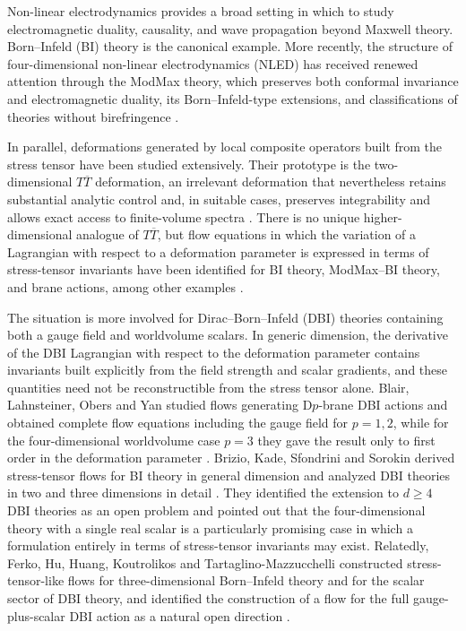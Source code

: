 \documentclass[a4paper,11pt]{article}
\numberwithin{equation}{section}
\begin{document}
Non-linear electrodynamics provides a broad setting in which to study electromagnetic duality, causality, and wave propagation beyond Maxwell theory. Born--Infeld (BI) theory is the canonical example. More recently, the structure of four-dimensional non-linear electrodynamics (NLED) has received renewed attention through the ModMax theory, which preserves both conformal invariance and electromagnetic duality, its Born--Infeld-type extensions, and classifications of theories without birefringence \cite{BornInfeld1934,Bandos2020,Sorokin2021,Ferko2023Birefringence,Ferko2023Duality}.

In parallel, deformations generated by local composite operators built from the stress tensor have been studied extensively. Their prototype is the two-dimensional $T\overline T$ deformation, an irrelevant deformation that nevertheless retains substantial analytic control and, in suitable cases, preserves integrability and allows exact access to finite-volume spectra \cite{SmirnovZamolodchikov2016}. There is no unique higher-dimensional analogue of $T\overline T$, but flow equations in which the variation of a Lagrangian with respect to a deformation parameter is expressed in terms of stress-tensor invariants have been identified for BI theory, ModMax--BI theory, and brane actions, among other examples \cite{Taylor2018,Ferko2022,Conti2022,Ferko2023Duality,Brizio2026}.

The situation is more involved for Dirac--Born--Infeld (DBI) theories containing both a gauge field and worldvolume scalars. In generic dimension, the derivative of the DBI Lagrangian with respect to the deformation parameter contains invariants built explicitly from the field strength and scalar gradients, and these quantities need not be reconstructible from the stress tensor alone. Blair, Lahnsteiner, Obers and Yan studied flows generating D$p$-brane DBI actions and obtained complete flow equations including the gauge field for $p=1,2$, while for the four-dimensional worldvolume case $p=3$ they gave the result only to first order in the deformation parameter \cite{Blair2025}. Brizio, Kade, Sfondrini and Sorokin derived stress-tensor flows for BI theory in general dimension and analyzed DBI theories in two and three dimensions in detail \cite{Brizio2026}. They identified the extension to $d\geq4$ DBI theories as an open problem and pointed out that the four-dimensional theory with a single real scalar is a particularly promising case in which a formulation entirely in terms of stress-tensor invariants may exist. Relatedly, Ferko, Hu, Huang, Koutrolikos and Tartaglino-Mazzucchelli constructed stress-tensor-like flows for three-dimensional Born--Infeld theory and for the scalar sector of DBI theory, and identified the construction of a flow for the full gauge-plus-scalar DBI action as a natural open direction \cite{Ferko2024DBI}.
\end{document}
